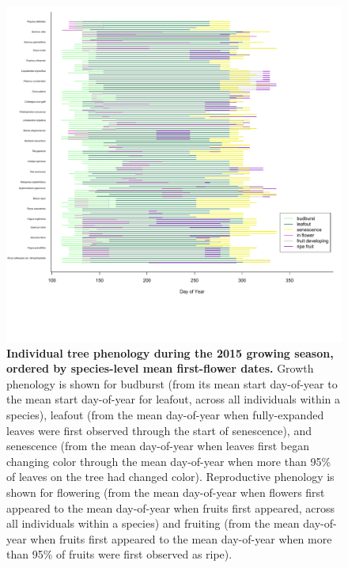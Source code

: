 \documentclass{article}
\begin{document}
\begin{figure}[h]
  \centering
  \includegraphics{../analyses/figures/grosea_repsort_ripefruit_ind_legend.pdf}
  \caption{\textbf{Individual tree phenology during the 2015 growing season, ordered by species-level mean first-flower dates.} Growth phenology is shown for budburst (from its mean start day-of-year to the mean start day-of-year for leafout, across all individuals within a species), leafout (from the mean day-of-year when fully-expanded leaves were first observed through the start of senescence), and senescence (from the mean day-of-year when leaves first began changing color through the mean day-of-year when more than 95\% of leaves on the tree had changed color). Reproductive phenology is shown for flowering (from the mean day-of-year when flowers first appeared to the mean day-of-year when fruits first appeared, across all individuals within a species) and fruiting (from the mean day-of-year when fruits first appeared to the mean day-of-year when more than 95\% of fruits were first observed as ripe).}
 \label{fig:focind}
\end{figure}
\clearpage
 
\end{document}
